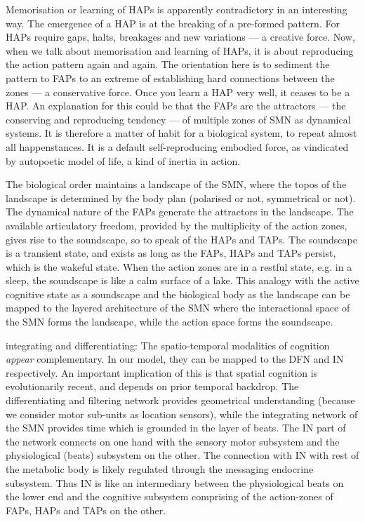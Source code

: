 Memorisation or learning of HAPs is apparently contradictory in an interesting way. The emergence of a HAP is at the breaking of a pre-formed pattern. For HAPs require gaps, halts, breakages and new variations --- a creative force. Now, when we talk about memorisation and learning of HAPs, it is about reproducing the action pattern again and again. The orientation here is to sediment the pattern to FAPs to an extreme of establishing hard connections between the zones --- a conservative force. Once you learn a HAP very well, it ceases to be a HAP. An explanation for this could be that the FAPs are the attractors ---  the conserving and reproducing tendency --- of multiple zones of SMN as dynamical systems. It is therefore a matter of habit for a biological system, to repeat almost all happenstances. It is a default self-reproducing embodied force, as vindicated by autopoetic model of life, a kind of inertia in action. 

The biological order maintains a landscape of the SMN, where the topos of the landscape is determined by the body plan (polarised or not, symmetrical or not). The dynamical nature of the FAPs generate the attractors in the landscape. The available articulatory freedom, provided by the multiplicity of the action zones, gives rise to the soundscape, so to speak of the HAPs and TAPs. The soundscape is a transient state, and exists as long as the FAPs, HAPs and TAPs persist, which is the wakeful state. When the action zones are in a restful state, e.g. in a sleep, the soundscape is like a calm surface of a lake. This analogy with the active cognitive state as a soundscape and the biological body as the landscape can be mapped to the layered architecture of the SMN where the interactional space of the SMN forms the landscape, while the action space forms the soundscape.

integrating and differentiating: The spatio-temporal modalities of cognition \textit{appear} complementary. In our model, they can be mapped to the DFN and IN respectively. An important implication of this is that spatial cognition is evolutionarily recent, and depends on prior temporal backdrop. The differentiating and filtering network provides geometrical understanding (because we consider motor sub-units as location sensors), while the integrating network of the SMN provides time which is grounded in the layer of beats. The IN part of the network connects on one hand with the sensory motor subsystem and the physiological (beats) subsystem on the other. The connection with IN with rest of the metabolic body is likely regulated through the messaging endocrine subsystem. Thus IN is like an intermediary between the physiological beats on the lower end and the cognitive subsystem comprising of the action-zones of FAPs, HAPs and TAPs on the other.

